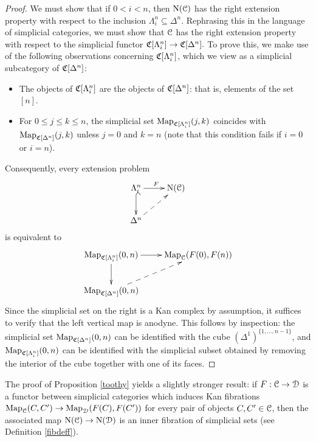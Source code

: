 \begin{proof}
We must show that if $0 < i < n$, then $\operatorname{N}(\operatorname{\mathcal{C}})$ has the right extension property with respect to the inclusion $\Lambda^n_i \subseteq \Delta^n$. Rephrasing this in the language of simplicial categories, we must show that $\operatorname{\mathcal{C}}$ has the right extension property with respect to the simplicial functor $\operatorname{\mathfrak{C}}[\Lambda^n_i] \rightarrow \operatorname{\mathfrak{C}}[\Delta^n].$
To prove this, we make use of the following observations concerning
$\operatorname{\mathfrak{C}}[\Lambda^n_i]$, which we view as a simplicial subcategory 
of $\operatorname{\mathfrak{C}}[\Delta^n]$:

\begin{itemize}
\item The objects of $\operatorname{\mathfrak{C}}[\Lambda^n_i]$ are the objects of
$\operatorname{\mathfrak{C}}[\Delta^n]$: that is, elements of the set $[n]$.

\item For $0 \leq j \leq k \leq n$, the simplicial set
$\operatorname{{Map}}_{\operatorname{\mathfrak{C}}[\Lambda^n_i]}(j,k)$ coincides with
$\operatorname{{Map}}_{\operatorname{\mathfrak{C}}[\Delta^n]}(j,k)$ unless $j=0$ and $k=n$
(note that this condition fails if $i=0$ or $i=n$).
\end{itemize}

Consequently, every extension problem
$$ \xymatrix{ \Lambda^n_i \ar@{^{(}->}[d] \ar[r]^{F} & \Nerve(\calC) \\
\Delta^n \ar@{-->}[ur] & }$$
is equivalent to
$$\xymatrix{ \bHom_{\sCoNerve[\Lambda^n_i]}(0,n) \ar[d] \ar[r] & \bHom_{\calC}(F(0), F(n)) \\
\bHom_{ \sCoNerve[\Delta^n]}(0,n) \ar@{-->}[ur]. & }$$
Since the simplicial set on the right is a Kan complex by assumption, it suffices to verify that the left vertical map is anodyne. This follows by inspection: the simplicial set $\operatorname{{Map}}_{ \operatorname{\mathfrak{C}}[ \Delta^n]}(0,n)$ can be identified with the cube $( \Delta^1 )^{ \{ 1, \ldots, n-1\} }$, and 
$\operatorname{{Map}}_{\operatorname{\mathfrak{C}}[ \Lambda^n_i]}(0,n)$ can be identified with the simplicial subset obtained by removing the interior of the cube together with one of its faces.
\end{proof}

\begin{remark}\label{goobrem}
The proof of Proposition \ref{toothy} yields a slightly stronger result: if $F: \operatorname{\mathcal{C}} \rightarrow \operatorname{\mathcal{D}}$ is a functor between simplicial categories which induces Kan fibrations
$\operatorname{{Map}}_{\operatorname{\mathcal{C}}}(C,C') \rightarrow \operatorname{{Map}}_{\operatorname{\mathcal{D}}}(F(C),F(C'))$ for every pair of objects $C,C' \in \operatorname{\mathcal{C}}$, then the associated map $\operatorname{N}(\operatorname{\mathcal{C}}) \rightarrow \operatorname{N}(\operatorname{\mathcal{D}})$ is an inner fibration of simplicial sets (see Definition \ref{fibdeff}).
\end{remark}

